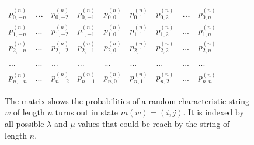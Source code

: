 \documentclass[10pt,a4paper]{article}
\numberwithin{equation}{section} %
\theoremstyle{plain}
\theoremstyle{definition}
\theoremstyle{remark}
\begin{document}
     \begin{figure}[h!]
        \label{matrix_fork_strings}
        \centering
        \begin{tabular}{|p{0.75cm}|p{0.75cm}|p{0.75cm}|p{0.75cm}|p{0.75cm}|p{0.75cm}|p{0.75cm}|p{0.75cm}|p{0.75cm}|}
             \hline
             \(p^{(n)}_{0,-n}\) & ... & \(p^{(n)}_{0,-2}\) & \(p^{(n)}_{0,-1}\) & \(p^{(n)}_{0,0}\) & \(p^{(n)}_{0,1}\) & \(p^{(n)}_{0,2}\) & ... & \(p^{(n)}_{0,n}\) \\
             \hline
             \(p^{(n)}_{1,-n}\) & ... & \(p^{(n)}_{1,-2}\) & \(p^{(n)}_{1,-1}\) & \(p^{(n)}_{1,0}\) & \(p^{(n)}_{1,1}\) & \(p^{(n)}_{1,2}\) & ... & \(p^{(n)}_{1,n}\) \\
             \hline
             \(p^{(n)}_{2,-n}\) & ... & \(p^{(n)}_{2,-2}\) & \(p^{(n)}_{2,-1}\) & \(p^{(n)}_{2,0}\) & \(p^{(n)}_{2,1}\) & \(p^{(n)}_{2,2}\) & ... & \(p^{(n)}_{2,n}\) \\
             \hline
             ...          & ... & ...          & ...          & ...         & ...         & ...         & ... & ...         \\
             \hline
             \(p^{(n)}_{n,-n}\) & ... & \(p^{(n)}_{n,-2}\) & \(p^{(n)}_{n,-1}\) & \(p^{(n)}_{n,0}\) & \(p^{(n)}_{n,1}\) & \(p^{(n)}_{n,2}\) & ... & \(p^{(n)}_{n,n}\) \\
             \hline
        \end{tabular}
        \caption{The matrix shows the probabilities of a random characteristic string \(w\) of length \(n\) turns out in state \(m(w)=(i,j)\). It is indexed by all possible \(\lambda\) and \(\mu\) values that could be reach by the string of length \(n\).}
    \end{figure}
    
\end{document}
